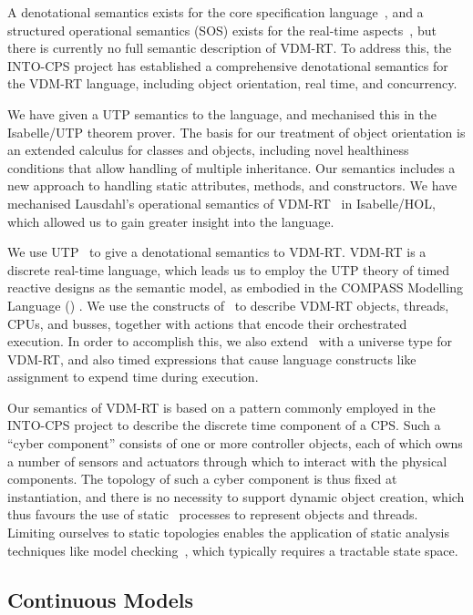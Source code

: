 A denotational semantics exists for the core specification language~\cite{Larsen&95c}, and a structured operational semantics (SOS) exists for the real-time aspects~\cite{Lausdahl&13a}, but there is currently no full semantic description of VDM-RT.  To address this, the INTO-CPS project has established a comprehensive denotational semantics for the VDM-RT language, including object orientation, real time, and concurrency.

We have given a UTP semantics to the language, and mechanised this in the Isabelle/UTP theorem prover.  The basis for our treatment of object orientation is an extended calculus for classes and objects, including novel healthiness conditions that allow handling of multiple inheritance.  Our semantics includes a new approach to handling static attributes, methods, and constructors.  We have mechanised Lausdahl's operational semantics of VDM-RT~\cite{Lausdahl&13a} in Isabelle/HOL, which allowed us to gain greater insight into the language.

We use UTP~\cite{Hoare&98,Cavalcanti&06} to give a denotational semantics to VDM-RT.  VDM-RT is a discrete real-time language, which leads us to employ the UTP theory of timed reactive designs as the semantic model, as embodied in the COMPASS Modelling Language (\CML) \cite{Woodcock&12a,Woodcock14,Woodcock&14}.  We use the constructs of \CML\ to describe VDM-RT objects, threads, CPUs, and busses, together with actions that encode their orchestrated execution.  In order to accomplish this, we also extend \CML\ with a universe type for VDM-RT, and also timed expressions that cause language constructs like assignment to expend time during execution.

Our semantics of VDM-RT is based on a pattern commonly employed in the INTO-CPS project to describe the discrete time component of a CPS.  Such a ``cyber component'' consists of one or more controller objects, each of which owns a number of sensors and actuators through which to interact with the physical components.  The topology of such a cyber component is thus fixed at instantiation, and there is no necessity to support dynamic object creation, which thus favours the use of static \CML\ processes to represent objects and threads.  Limiting ourselves to static topologies enables the application of static analysis techniques like model checking~\cite{fdr,Oliveira2014,Beg2015}, which typically requires a tractable state space.

\subsection{Continuous Models}

